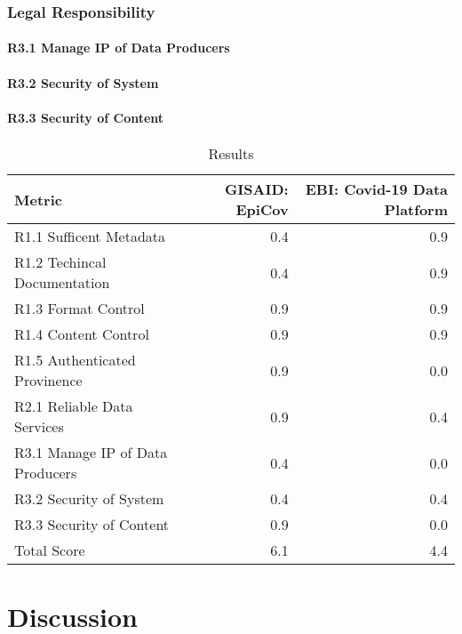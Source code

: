 \documentclass{article}
\begin{document}
\hypertarget{legal-responsibility-2}{%
\subsubsection{Legal Responsibility}\label{legal-responsibility-2}}

\hypertarget{r3.1-manage-ip-of-data-producers-1}{%
\paragraph{R3.1 Manage IP of Data
Producers}\label{r3.1-manage-ip-of-data-producers-1}}

\hypertarget{r3.2-security-of-system-1}{%
\paragraph{R3.2 Security of System}\label{r3.2-security-of-system-1}}

\hypertarget{r3.3-security-of-content-1}{%
\paragraph{R3.3 Security of Content}\label{r3.3-security-of-content-1}}

\begin{table}[H]

\caption{\label{tab:fig3}Results}
\centering
\begin{tabular}[t]{l|r|r}
\hline
Metric & GISAID: EpiCov & EBI: Covid-19 Data Platform\\
\hline
R1.1 Sufficent Metadata & 0.4 & 0.9\\
\hline
R1.2 Techincal Documentation & 0.4 & 0.9\\
\hline
R1.3 Format Control & 0.9 & 0.9\\
\hline
R1.4 Content Control & 0.9 & 0.9\\
\hline
R1.5 Authenticated Provinence & 0.9 & 0.0\\
\hline
R2.1 Reliable Data Services & 0.9 & 0.4\\
\hline
R3.1 Manage IP of Data Producers & 0.4 & 0.0\\
\hline
R3.2 Security of System & 0.4 & 0.4\\
\hline
R3.3 Security of Content & 0.9 & 0.0\\
\hline
Total Score & 6.1 & 4.4\\
\hline
\end{tabular}
\end{table}

\hypertarget{discussion}{%
\section{Discussion}\label{discussion}}
\end{document}
